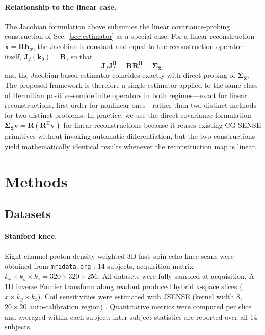 \documentclass[AMA,STIX2COL,Linenumberson]{MRM}
\begin{document}
\paragraph{Relationship to the linear case.}
The Jacobian formulation above subsumes the linear covariance-probing construction of Sec.~\ref{sec:estimator} as a special case. For a linear reconstruction $\hat{\mathbf{x}} = \mathbf{R}\mathbf{b}_w$, the Jacobian is constant and equal to the reconstruction operator itself, $\mathbf{J}_f(\mathbf{k}_0) = \mathbf{R}$, so that
\begin{equation}
\mathbf{J}_f\mathbf{J}_f^{\mathrm{H}} = \mathbf{R}\mathbf{R}^{\mathrm{H}} = \boldsymbol{\Sigma}_{\hat{\mathbf{x}}},
\label{eq:linear_equivalence}
\end{equation}
and the Jacobian-based estimator coincides exactly with direct probing of $\boldsymbol{\Sigma}_{\hat{\mathbf{x}}}$. The proposed framework is therefore a single estimator applied to the same class of Hermitian positive-semidefinite operators in both regimes---exact for linear reconstructions, first-order for nonlinear ones---rather than two distinct methods for two distinct problems. In practice, we use the direct covariance formulation $\boldsymbol{\Sigma}_{\hat{\mathbf{x}}}\mathbf{v} = \mathbf{R}(\mathbf{R}^{\mathrm{H}}\mathbf{v})$ for linear reconstructions because it reuses existing CG-SENSE primitives without invoking automatic differentiation, but the two constructions yield mathematically identical results whenever the reconstruction map is linear.

\section{Methods}


\subsection{Datasets}
\label{sec:methods}

\paragraph{Stanford knee.}
Eight-channel proton-density-weighted 3D fast--spin-echo knee scans were obtained from \texttt{mridata.org} \cite{epperson2013creation}: 14 subjects, acquisition matrix $k_x \times k_y \times k_z = 320 \times 320 \times 256$. All datasets were fully sampled at acquisition. A 1D inverse Fourier transform along readout produced hybrid k-space slices ($x \times k_y \times k_z$). Coil sensitivities were estimated with JSENSE (kernel width 8, $20 \times 20$ auto-calibration region) \cite{jsense}. Quantitative metrics were computed per slice and averaged within each subject; inter-subject statistics are reported over all 14 subjects.
\end{document}
